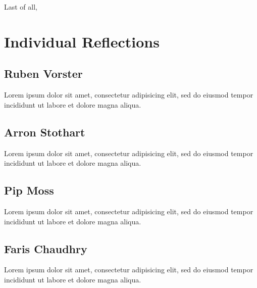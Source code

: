 \documentclass[11pt]{article}
\begin{document}
Last of all,  

\section{Individual Reflections}
\subsection{Ruben Vorster}
Lorem ipsum dolor sit amet, consectetur adipisicing elit, sed do eiusmod tempor
incididunt ut labore et dolore magna aliqua.
\subsection{Arron Stothart}
Lorem ipsum dolor sit amet, consectetur adipisicing elit, sed do eiusmod tempor
incididunt ut labore et dolore magna aliqua.
\subsection{Pip Moss}
Lorem ipsum dolor sit amet, consectetur adipisicing elit, sed do eiusmod tempor
incididunt ut labore et dolore magna aliqua.
\subsection{Faris Chaudhry}
Lorem ipsum dolor sit amet, consectetur adipisicing elit, sed do eiusmod tempor
incididunt ut labore et dolore magna aliqua.
\end{document}
